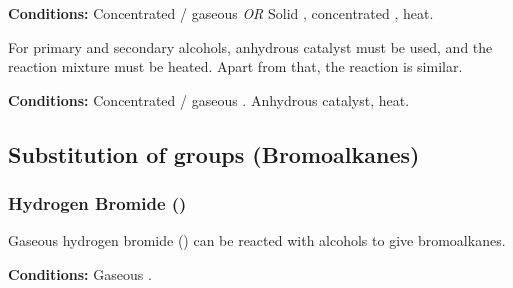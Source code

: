 				\vspace{1.5em}
				\vbox{\textbf{Conditions:}	\tabto{35mm}Concentrated  / gaseous  \textit{OR}
											\tabto{35mm}Solid , concentrated , heat.}



				For primary and secondary alcohols, anhydrous  catalyst must be used, and the reaction mixture
				must be heated. Apart from that, the reaction is similar.

				\vspace{1.5em}
				\vbox{\textbf{Conditions:}	\tabto{35mm}Concentrated  / gaseous .
											\tabto{35mm}Anhydrous  catalyst, heat.}


		\pagebreak
		\subsection{Substitution of  groups (Bromoalkanes)}

			\subsubsection{Hydrogen Bromide ()}

				Gaseous hydrogen bromide () can be reacted with alcohols to give bromoalkanes.

				\vspace{1.5em}
				\vbox{\textbf{Conditions:}	\tabto{35mm}Gaseous .}

